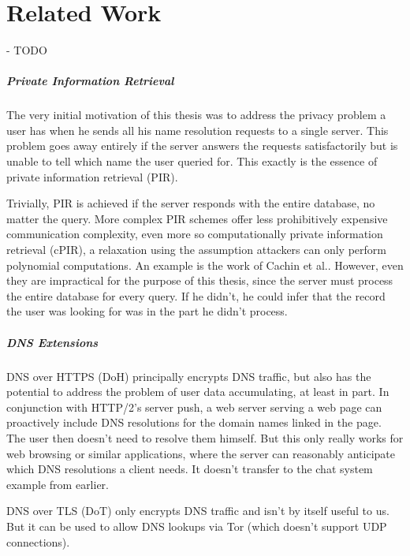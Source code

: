 \chapter{Related Work}
\label{chap:related_work}
- TODO

\paragraph{Private Information Retrieval}
The very initial motivation of this thesis was to address the privacy problem a
user has when he sends all his name resolution requests to a single server. This
problem goes away entirely if the server answers the requests satisfactorily but
is unable to tell which name the user queried for. This exactly is the essence
of private information retrieval (PIR)\cite{gasarch2004survey}.

Trivially, PIR is achieved if the server responds with the entire database, no
matter the query. More complex PIR schemes offer less prohibitively expensive
communication complexity, even more so computationally private information
retrieval (cPIR), a relaxation using the assumption attackers can only perform
polynomial computations. An example is the work of Cachin et
al.\cite{cachin1999computationally}. However, even they are impractical for the
purpose of this thesis, since the server must process the entire database for
every query. If he didn't, he could infer that the record the user was looking
for was in the part he didn't process.

\paragraph{DNS Extensions}
DNS over HTTPS (DoH)\cite{RFC8484} principally encrypts DNS traffic, but also
has the potential to address the problem of user data accumulating, at least in
part. In conjunction with HTTP/2's server push\cite{RFC7540}, a web server
serving a web page can proactively include DNS resolutions for the domain names
linked in the page. The user then doesn't need to resolve them himself. But this
only really works for web browsing or similar applications, where the server can
reasonably anticipate which DNS resolutions a client needs. It doesn't transfer
to the chat system example from earlier.

DNS over TLS (DoT)\cite{RFC7858} only encrypts DNS traffic and isn't by itself
useful to us. But it can be used to allow DNS lookups via
Tor\cite{dingledine2004tor} (which doesn't support UDP connections).

